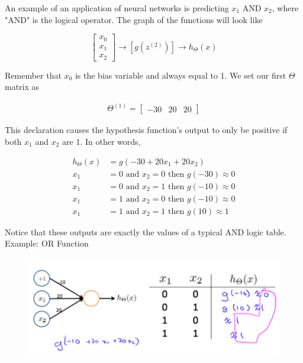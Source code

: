 \documentclass{article}
\begin{document}
        \noindent An example of an application of neural networks is predicting $x_1$ AND $x_2$, where "AND"
        is the logical operator. The graph of the functions will look like

        \begin{equation*}
            \begin{bmatrix}x_0 \\ x_1 \\ x_2 \end{bmatrix}
            \to
            \left[g(z^{(2)})\right]
            \to
            h_{\Theta}(x)
        \end{equation*}

        \noindent Remember that $x_0$ is the bias variable and always equal to 1. We set our first $\Theta$
        matrix as

        \begin{align*}
            \Theta^{(1)} = \begin{bmatrix}-30 & 20 & 20\end{bmatrix}
        \end{align*}

        \noindent This declaration causes the hypothesis function's output to only be positive if both $x_1$
        and $x_2$ are 1. In other words,

        \begin{align*}
            h_{\Theta}(x)   &= g(-30+20x_1 + 20x_2) \\
            x_1             &= 0 \text{ and } x_2=0 \text{ then } g(-30)\approx 0 \\
            x_1             &= 0 \text{ and } x_2=1 \text{ then } g(-10)\approx 0 \\
            x_1             &= 1 \text{ and } x_2=0 \text{ then } g(-10)\approx 0 \\
            x_1             &= 1 \text{ and } x_2=1 \text{ then } g(10)\approx 1
        \end{align*}

        \noindent Notice that these outputs are exactly the values of a typical AND logic table. \\

        \noindent Example: OR Function

        \begin{figure}[hbt!]
            \centering
            \includegraphics[scale=0.6]{Resources/OR_Net}
        \end{figure}
\end{document}
